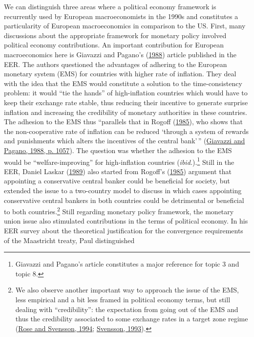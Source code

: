 \documentclass[
]{article}
\begin{document}
We can distinguish three areas where a political economy framework is
recurrently used by European macroeconomists in the 1990s and
constitutes a particularity of European macroeconomics in comparison to
the US. First, many discussions about the appropriate framework for
monetary policy involved political economy contributions. An important
contribution for European macroeconomics here is Giavazzi and Pagano's
(\protect\hyperlink{ref-giavazzi1988}{1988}) article published in the
EER. The authors questioned the advantages of adhering to the European
monetary system (EMS) for countries with higher rate of inflation. They
deal with the idea that the EMS would constitute a solution to the
time-consistency problem: it would ``tie the hands'' of high-inflation
countries which would have to keep their exchange rate stable, thus
reducing their incentive to generate surprise inflation and increasing
the credibility of monetary authorities in these countries. The adhesion
to the EMS thus ``parallels that in Rogoff
(\protect\hyperlink{ref-rogoff1985b}{1985}), who shows that the
non-cooperative rate of inflation can be reduced `through a system of
rewards and punishments which alters the incentives of the central
bank'\,'' (\protect\hyperlink{ref-giavazzi1988}{Giavazzi and Pagano,
1988, p. 1057}). The question was whether the adhesion to the EMS would
be ``welfare-improving'' for high-inflation countries
(\emph{ibid.}).\footnote{Giavazzi and Pagano's article constitutes a
  major reference for topic 3 and topic 8.} Still in the EER, Daniel
Laskar (\protect\hyperlink{ref-laskar1989}{1989}) also started from
Rogoff's (\protect\hyperlink{ref-rogoff1985b}{1985}) argument that
appointing a conservative central banker could be beneficial for
society, but extended the issue to a two-country model to discuss in
which cases appointing conservative central bankers in both countries
could be detrimental or beneficial to both countries.\footnote{We also
  observe another important way to approach the issue of the EMS, less
  empirical and a bit less framed in political economy terms, but still
  dealing with ``credibility'': the expectation from going out of the
  EMS and thus the credibility associated to some exchange rates in a
  target zone regime (\protect\hyperlink{ref-rose1994}{Rose and
  Svensson, 1994}; \protect\hyperlink{ref-svensson1993a}{Svensson,
  1993}).} Still regarding monetary policy framework, the monetary union
issue also stimulated contributions in the terms of political economy.
In his EER survey about the theoretical justification for the
convergence requirements of the Maastricht treaty, Paul distinguished
\end{document}
